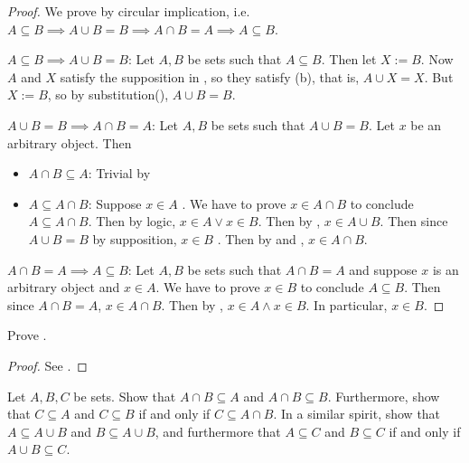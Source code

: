 \begin{proof} We prove by circular implication, i.e. \(A \subseteq B \implies A \cup B = B \implies A \cap B = A \implies A \subseteq B\).

\(A \subseteq B \implies A \cup B = B\): Let \(A, B\) be sets such that \(A \subseteq B\). Then let \(X := B\). Now \(A\) and \(X\) satisfy the supposition in , so they satisfy (b), that is, \(A \cup X = X\). But \(X := B\), so by substitution(), \(A \cup B = B\).

\(A \cup B = B \implies A \cap B = A\): Let \(A, B\) be sets such that \(A \cup B = B\). Let \(x\) be an arbitrary object. Then
\begin{itemize}
    \item \(A \cap B \subseteq A\): Trivial by 
    \item \(A \subseteq A \cap B\): Suppose \(x \in A\) . We have to prove \(x \in A \cap B\) to conclude \(A \subseteq A \cap B\). Then by logic, \(x \in A \lor x \in B\). Then by , \(x \in A \cup B\). Then since \(A \cup B = B\) by supposition, \(x \in B\) . Then by  and , \(x \in A \cap B\).
\end{itemize}

\(A \cap B = A \implies A \subseteq B\): Let \(A, B\) be sets such that \(A \cap B = A\) and suppose \(x\) is an arbitrary object and \(x \in A\). We have to prove \(x \in B\) to conclude \(A \subseteq B\). Then since \(A \cap B = A\), \(x \in A \cap B\). Then by , \(x \in A \land x \in B\). In particular, \(x \in B\).
\end{proof}

\begin{exercise}\label{exercise 3.1.6}
    Prove .
\end{exercise}

\begin{proof}
    See .
\end{proof}

\begin{exercise}\label{exercise 3.1.7}
Let \(A, B, C\) be sets. Show that \(A \cap B \subseteq A\) and \(A \cap B \subseteq B\). Furthermore, show that \(C \subseteq A\) and \(C \subseteq B\) if and only if \(C \subseteq A \cap B\). In a similar spirit, show that \(A \subseteq A \cup B\) and \(B \subseteq A \cup B\), and furthermore that \(A \subseteq C\) and \(B \subseteq C\) if and only if \(A \cup B \subseteq C\).
\end{exercise}

